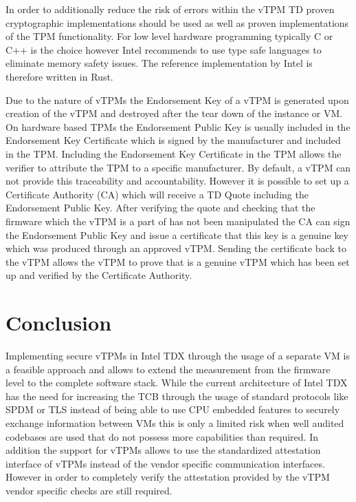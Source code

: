 \documentclass[sigplan,screen,nonacm]{acmart}
\begin{document}
In order to additionally reduce the risk of errors within the vTPM TD proven cryptographic implementations should be used as well as proven implementations of the TPM functionality.
For low level hardware programming typically C or C++ is the choice however Intel recommends to use type safe languages to eliminate memory safety issues\cite[p. 20]{Intel-vTPM}.
The reference implementation by Intel is therefore written in Rust\cite[p. 20]{Intel-vTPM}.

Due to the nature of vTPMs the Endorsement Key of a vTPM is generated upon creation of the vTPM and destroyed after the tear down of the instance or VM.
On hardware based TPMs the Endorsement Public Key is usually included in the Endorsement Key Certificate which is signed by the manufacturer and included in the TPM.
Including the Endorsement Key Certificate in the TPM allows the verifier to attribute the TPM to a specific manufacturer.
By default, a vTPM can not provide this traceability and accountability.
However it is possible to set up a Certificate Authority (CA) which will receive a TD Quote including the Endorsement Public Key.
After verifying the quote and checking that the firmware which the vTPM is a part of has not been manipulated the CA can sign the Endorsement Public Key and issue a certificate that this key is a genuine key which was produced through an approved vTPM.
Sending the certificate back to the vTPM allows the vTPM to prove that is a genuine vTPM which has been set up and verified by the Certificate Authority.

\section{Conclusion}
Implementing secure vTPMs in Intel TDX through the usage of a separate VM is a feasible approach and allows to extend the measurement from the firmware level to the complete software stack.
While the current architecture of Intel TDX has the need for increasing the TCB through the usage of standard protocols like SPDM or TLS instead of being able to use CPU embedded features to securely exchange information between VMs this is only a limited risk when well audited codebases are used that do not possess more capabilities than required.
In addition the support for vTPMs allows to use the standardized attestation interface of vTPMs instead of the vendor specific communication interfaces.
However in order to completely verify the attestation provided by the vTPM vendor specific checks are still required.



\end{document}

